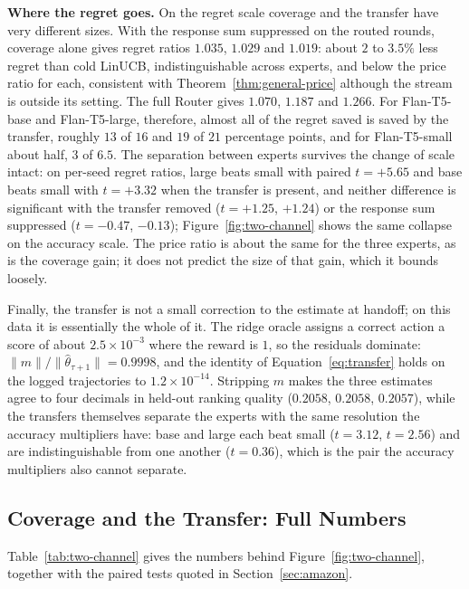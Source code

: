 \documentclass[anon]{alt2027} %
\begin{document}
\textbf{Where the regret goes.} On the regret scale coverage and the transfer
have very different sizes. With the response sum suppressed on the routed
rounds, coverage alone gives regret ratios $1.035$, $1.029$ and $1.019$:
about $2$ to $3.5\%$ less regret than cold LinUCB, indistinguishable across
experts, and below the price ratio for each, consistent with
Theorem~\ref{thm:general-price} although the stream is outside its setting.
The full Router gives $1.070$, $1.187$ and $1.266$. For Flan-T5-base and
Flan-T5-large, therefore, almost all of the regret saved is saved by the
transfer, roughly $13$ of $16$ and $19$ of $21$ percentage points, and for
Flan-T5-small about half, $3$ of $6.5$. The separation between experts
survives the change of scale intact: on per-seed regret ratios, large beats
small with paired $t=+5.65$ and base beats small with $t=+3.32$ when the
transfer is present, and neither difference is significant with the transfer
removed ($t=+1.25$, $+1.24$) or the response sum suppressed ($t=-0.47$,
$-0.13$); Figure~\ref{fig:two-channel} shows the same
collapse on the accuracy scale. The price ratio is about the same for the
three experts, as is the coverage gain; it does not predict the size of that
gain, which it bounds loosely.

Finally, the transfer is not a small correction to the estimate at handoff; on
this data it is essentially the whole of it. The ridge oracle assigns a
correct action a score of about $2.5\times10^{-3}$ where the reward is $1$, so
the residuals dominate: $\|m\|/\|\widehat\theta_{\tau+1}\|=0.9998$, and the
identity of Equation~\eqref{eq:transfer} holds on the logged trajectories
to $1.2\times10^{-14}$. Stripping $m$ makes the three estimates agree to four
decimals in held-out ranking quality ($0.2058$, $0.2058$, $0.2057$), while the
transfers themselves separate the experts with the same resolution the
accuracy multipliers have: base and large each beat small ($t=3.12$, $t=2.56$) and are
indistinguishable from one another ($t=0.36$), which is the pair the
accuracy multipliers also cannot separate.

\subsection{Coverage and the Transfer: Full Numbers}
\label{app:two-channel}

Table~\ref{tab:two-channel} gives the numbers behind
Figure~\ref{fig:two-channel}, together with the paired tests quoted in
Section~\ref{sec:amazon}.
\end{document}

